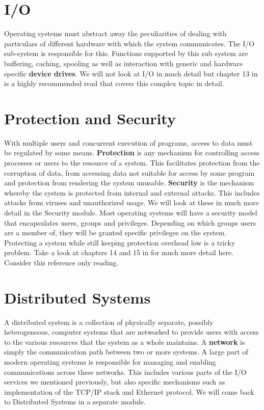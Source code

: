 \documentclass[10pt,a4paper]{article}
\begin{document}
\section{I/O}
Operating systems must abstract away the peculiarities of dealing with particulars of different hardware with which the system communicates. The I/O sub-system is responsible for this. Functions supported by this sub system are buffering, caching, spooling as well as interaction with generic and hardware specific {\bf device drives}. We will not look at I/O in much detail but chapter 13 in \cite{OSCONCEPTS} is a highly recommended read that covers this complex topic in detail.
\section{Protection and Security}
With multiple users and concurrent execution of programs, access to data must be regulated by some means. {\bf Protection} is any mechanism for controlling access processes or users to the resource of a system. This facilitates protection from the corruption of data, from accessing data not suitable for access by some program and protection from rendering the system unusable. {\bf Security} is the mechanism whereby the system is protected from internal and external attacks. This includes attacks from viruses and unauthorized usage. We will look at these in much more detail in the Security module. Most operating systems will have a security model that encapsulates users, groups and privileges. Depending on which groups users are a member of, they will be granted specific privileges on the system. Protecting a system while still keeping protection overhead low is a tricky problem. Take a look at chapters 14 and 15 in \cite{OSCONCEPTS} for much more detail here. Consider this reference only reading. 
\section{Distributed Systems}
A distributed system is a collection of physically separate, possibly heterogeneous, computer systems that are networked to provide users with access to the various resources that the system as a whole maintains. A {\bf network} is simply the communication path between two or more systems. A large part of modern operating systems is responsible for managing and enabling communications across these networks. This includes various parts of the I/O services we mentioned previously, but also specific mechanisms such as implementation of the TCP/IP stack and Ethernet protocol. We will come back to Distributed Systems in a separate module. 
\end{document}
